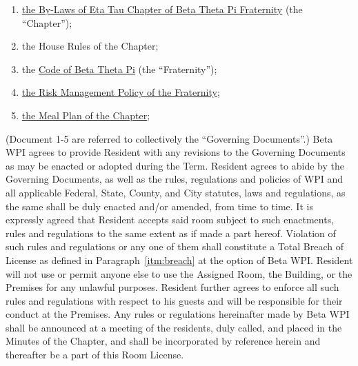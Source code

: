 \documentclass[legalpaper, 12pt]{article}
\begin{document}
\begin{enumerate}
\begin{enumerate}[label=\arabic*)]

        \item \href{https://docs.google.com/document/d/19zC4bDC3ZrdCWqLJ8Y0Z35mJEEDPLed1o6GGvX5XCGw/edit?usp=sharing} {the By-Laws of Eta Tau Chapter of Beta Theta Pi Fraternity} (the ``Chapter''); 

        \item the House Rules of the Chapter; 

        \item the \href{https://beta.org/wp-content/uploads/2020/08/Code-of-Beta-Theta-Pi_08.13.2020.pdf}{Code of Beta Theta Pi} (the ``Fraternity'');

        \item \href{https://beta.org/wp-content/uploads/2020/08/Beta-Theta-Pi-Risk-Management-Policy-August-2020.pdf}{the Risk Management Policy of the Fraternity};

        \item \href{https://docs.google.com/document/d/1TNQDLowFoC3HZo6kSRtdvaxXrOXnMxME0UXYeSga4I8/edit?usp=sharing}{the Meal Plan of the Chapter}; 

\end{enumerate} 

(Document 1-5 are referred to collectively the ``Governing Documents''.) Beta WPI agrees to provide Resident with any revisions to the Governing Documents as may be enacted or adopted during the Term.
Resident agrees to abide by the Governing Documents, as well as the rules, regulations and policies of WPI and all applicable Federal, State, County, and City statutes, laws and regulations, as the same shall be duly enacted and/or amended, from time to time.
It is expressly agreed that Resident accepts said room subject to such enactments, rules and regulations to the same extent as if made a part hereof.
Violation of such rules and regulations or any one of them shall constitute a Total Breach of License as defined in Paragraph~\ref{itm:breach} at the option of Beta WPI\@.
Resident will not use or permit anyone else to use the Assigned Room, the Building, or the Premises for any unlawful purposes.
Resident further agrees to enforce all such rules and regulations with respect to his guests and will be responsible for their conduct at the Premises.
Any rules or regulations hereinafter made by Beta WPI shall be announced at a meeting of the residents, duly called, and placed in the Minutes of the Chapter, and shall be incorporated by reference herein and thereafter be a part of this Room License.


\end{enumerate}
\end{document}
